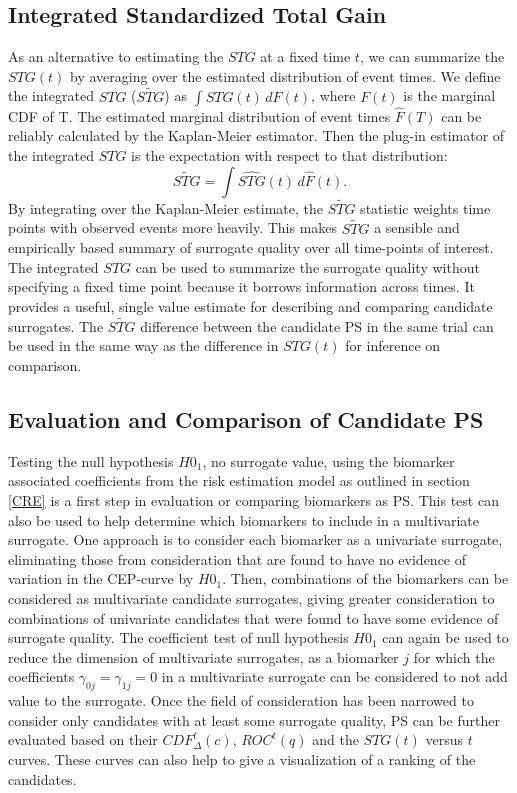 \documentclass[times, doublespace]{simauth}
\begin{document}
\subsection{Integrated Standardized Total Gain} \label{ISTG}
As an alternative to estimating the $STG$ at a fixed time $t$, we can summarize the $STG(t)$ by averaging over the estimated distribution of event times. We define the integrated $STG$ ($\widetilde{STG}$) as $\int STG(t) \, dF(t)$, where $F(t)$ is the marginal CDF of T. The estimated marginal distribution of event times $\hat{F}(T)$ can be reliably calculated by the Kaplan-Meier estimator. Then the plug-in estimator of the integrated $STG$ is the expectation with respect to that distribution:
\[
 \widetilde{STG} = \int \widehat{STG}(t) \, d \hat{F}(t). 
\]
By integrating over the Kaplan-Meier estimate, the $\widetilde{STG}$ statistic weights time points with observed events more heavily. This makes $\widetilde{STG}$ a sensible and empirically based summary of surrogate quality over all time-points of interest. The integrated $STG$ can be used to summarize the surrogate quality without specifying a fixed time point because it borrows information across times. It provides a useful, single value estimate for describing and comparing candidate surrogates. The $\widetilde{STG}$ difference between the candidate PS in the same trial can be used in the same way as the difference in $STG(t)$ for inference on comparison.

\subsection{Evaluation and Comparison of Candidate PS} \label{DEF}
Testing the null hypothesis $H0_1$, no surrogate value, using the biomarker associated coefficients from the risk estimation model as outlined in section \ref{CRE} is a first step in evaluation or comparing biomarkers as PS.  This test can also be used to help determine which biomarkers to include in a multivariate surrogate. One approach is to consider each biomarker as a univariate surrogate, eliminating those from consideration that are found to have no evidence of variation in the CEP-curve by $H0_1$. Then, combinations of the biomarkers can be considered as multivariate candidate surrogates, giving greater consideration to combinations of univariate candidates that were found to have some evidence of surrogate quality. The coefficient test of  null hypothesis $H0_1$ can again be used to reduce the dimension of multivariate surrogates, as a biomarker $j$ for which the coefficients $\gamma_{0j}=\gamma_{1j}=0$ in a multivariate surrogate can be considered to not add value to the surrogate. Once the field of consideration has been narrowed to consider only candidates with at least some surrogate quality, PS can be further evaluated based on their $CDF^{t}_{\Delta}(c)$, $ROC^{t}(q)$ and the $STG(t)$ versus $t$ curves. These curves can also help to give a visualization of a ranking of the candidates. 
\end{document}
